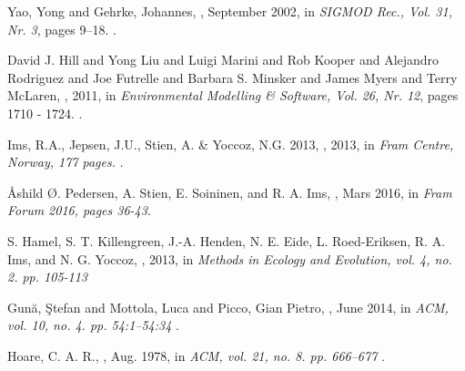 \documentclass[USenglish]{uit-thesis}
\begin{document}
\begin{thebibliography}{9}
Yao, Yong and Gehrke, Johannes,
, September 2002,
\newblock in {\em  SIGMOD Rec., Vol. 31, Nr. 3}, pages 9--18.
.

David J. Hill and Yong Liu and Luigi Marini and Rob Kooper and Alejandro Rodriguez and Joe Futrelle and Barbara S. Minsker and James Myers and Terry McLaren,
, 2011,
\newblock in {\em  Environmental Modelling \& Software, Vol. 26, Nr. 12}, pages 1710 - 1724.
.

Ims, R.A., Jepsen, J.U., Stien, A. \& Yoccoz, N.G. 2013,
, 2013,
\newblock in {\em  Fram Centre, Norway, 177 pages.}
.

Åshild Ø. Pedersen, A. Stien, E. Soininen, and R. A. Ims,
, Mars 2016,
\newblock in {\em  Fram Forum 2016, pages 36-43.}

S. Hamel, S. T. Killengreen, J.-A. Henden, N. E. Eide, L. Roed-Eriksen, R. A. Ims, and N. G. Yoccoz,
, 2013,
\newblock in {\em Methods in Ecology and Evolution, vol. 4, no. 2. pp. 105-113}

Gun\u{a}, \c{S}tefan and Mottola, Luca and Picco, Gian Pietro,
, June 2014,
\newblock in {\em ACM, vol. 10, no. 4. pp. 54:1--54:34}
.

Hoare, C. A. R.,
, Aug. 1978,
\newblock in {\em ACM, vol. 21, no. 8. pp. 666--677}
.


\end{thebibliography}
\end{document}
